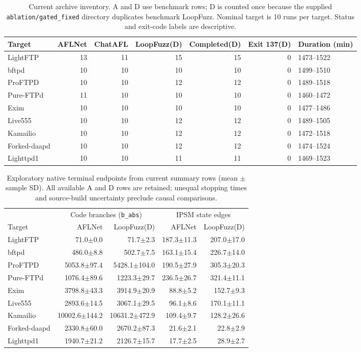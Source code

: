 \begin{table}[!tbp]
\centering\small
\caption{Current archive inventory. A and D use benchmark rows; D is counted once because the supplied \texttt{ablation/gated\_fixed} directory duplicates benchmark LoopFuzz. Nominal target is 10 runs per target. Status and exit-code labels are descriptive.}
\label{tab:observed_inventory}
\begin{tabular}{lrrrrrl}
\toprule
Target & AFLNet & ChatAFL & LoopFuzz(D) & Completed(D) & Exit 137(D) & Duration (min) \\
\midrule
LightFTP & 13 & 11 & 15 & 15 & 0 & 1473--1522 \\
bftpd & 10 & 10 & 10 & 10 & 0 & 1499--1510 \\
ProFTPD & 10 & 10 & 12 & 12 & 0 & 1489--1518 \\
Pure-FTPd & 11 & 10 & 10 & 10 & 0 & 1460--1472 \\
Exim & 10 & 10 & 10 & 10 & 0 & 1477--1486 \\
Live555 & 10 & 10 & 12 & 12 & 0 & 1489--1505 \\
Kamailio & 10 & 10 & 12 & 12 & 0 & 1472--1518 \\
Forked-daapd & 10 & 10 & 12 & 12 & 0 & 1474--1524 \\
Lighttpd1 & 10 & 10 & 11 & 11 & 0 & 1469--1523 \\
\bottomrule
\end{tabular}
\end{table}
\begin{table}[!tbp]
\centering\small
\caption{Exploratory native terminal endpoints from current summary rows (mean $\pm$ sample SD). All available A and D rows are retained; unequal stopping times and source-build uncertainty preclude causal comparisons.}
\label{tab:observed_endpoints}
\begin{tabular}{lrrrr}
\toprule
 & \multicolumn{2}{c}{Code branches (\texttt{b\_abs})} & \multicolumn{2}{c}{IPSM state edges} \\
Target & AFLNet & LoopFuzz(D) & AFLNet & LoopFuzz(D) \\
\midrule
LightFTP & 71.0$\pm$0.0 & 71.7$\pm$2.3 & 187.3$\pm$11.3 & 207.0$\pm$17.0 \\
bftpd & 486.0$\pm$8.8 & 502.7$\pm$7.5 & 163.1$\pm$15.4 & 226.7$\pm$14.0 \\
ProFTPD & 5053.8$\pm$97.4 & 5428.1$\pm$104.0 & 190.5$\pm$27.9 & 305.3$\pm$20.3 \\
Pure-FTPd & 1076.4$\pm$89.6 & 1223.3$\pm$29.7 & 236.5$\pm$26.7 & 321.4$\pm$11.1 \\
Exim & 3798.8$\pm$43.3 & 3914.9$\pm$20.9 & 88.8$\pm$5.2 & 152.7$\pm$9.3 \\
Live555 & 2893.6$\pm$14.5 & 3067.1$\pm$29.5 & 96.1$\pm$8.6 & 170.1$\pm$11.1 \\
Kamailio & 10002.6$\pm$144.2 & 10631.2$\pm$472.9 & 109.4$\pm$9.7 & 128.2$\pm$26.6 \\
Forked-daapd & 2330.8$\pm$60.0 & 2670.2$\pm$87.3 & 21.6$\pm$2.1 & 22.8$\pm$2.9 \\
Lighttpd1 & 1940.7$\pm$21.2 & 2126.7$\pm$15.7 & 17.7$\pm$2.5 & 28.9$\pm$2.7 \\
\bottomrule
\end{tabular}
\end{table}
